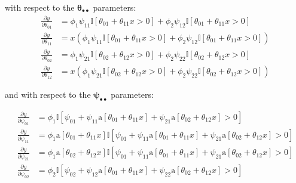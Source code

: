 \documentclass[12pt]{report}
\begin{document}
with respect to the $\boldsymbol{\theta}_{\bullet\bullet}$ parameters:
\begin{align*}
    \frac{\partial y}{\partial \theta_{01}} & = \phi_{1}\psi_{11}\mathbb{I}[\theta_{01} + \theta_{11}x > 0] + \phi_{2}\psi_{12}\mathbb{I}[\theta_{01} + \theta_{11}x > 0]    \\
    \frac{\partial y}{\partial \theta_{11}} & = x(\phi_{1}\psi_{11}\mathbb{I}[\theta_{01} + \theta_{11}x > 0] + \phi_{2}\psi_{12}\mathbb{I}[\theta_{01} + \theta_{11}x > 0]) \\
    \frac{\partial y}{\partial \theta_{02}} & = \phi_{1}\psi_{21}\mathbb{I}[\theta_{02} + \theta_{12}x > 0] + \phi_{2}\psi_{22}\mathbb{I}[\theta_{02} + \theta_{12}x > 0]    \\
    \frac{\partial y}{\partial \theta_{12}} & = x(\phi_{1}\psi_{21}\mathbb{I}[\theta_{02} + \theta_{12}x > 0] + \phi_{2}\psi_{22}\mathbb{I}[\theta_{02} + \theta_{12}x > 0])
\end{align*}

and with respect to the $\boldsymbol{\psi}_{\bullet\bullet}$ parameters:

\begin{align*}
    \frac{\partial y}{\partial \psi_{01}} & = \phi_{1}\mathbb{I}[\psi_{01} + \psi_{11}\text{a}[\theta_{01} + \theta_{11}x] + \psi_{21}\text{a}[\theta_{02} + \theta_{12}x] > 0]                                     \\
    \frac{\partial y}{\partial \psi_{11}} & = \phi_{1}\text{a}[\theta_{01} + \theta_{11}x]\mathbb{I}[\psi_{01} + \psi_{11}\text{a}[\theta_{01} + \theta_{11}x] + \psi_{21}\text{a}[\theta_{02} + \theta_{12}x] > 0] \\
    \frac{\partial y}{\partial \psi_{21}} & = \phi_{1}\text{a}[\theta_{02} + \theta_{12}x]\mathbb{I}[\psi_{01} + \psi_{11}\text{a}[\theta_{01} + \theta_{11}x] + \psi_{21}\text{a}[\theta_{02} + \theta_{12}x] > 0] \\
    \frac{\partial y}{\partial \psi_{02}} & = \phi_{2}\mathbb{I}[\psi_{02} + \psi_{12}\text{a}[\theta_{01} + \theta_{11}x] + \psi_{22}\text{a}[\theta_{02} + \theta_{12}x] > 0]
\end{align*}
\end{document}
